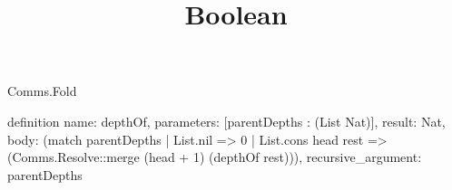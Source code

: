 \begin{lexlean}{Comms.Fold}
\title{Boolean}
\begin{semanticmodule}
definition{
  name: depthOf,
  parameters: [parentDepths : (List Nat)],
  result: Nat,
  body: (match parentDepths
    | List.nil => 0
    | List.cons head rest => (Comms.Resolve::merge (head + 1) (depthOf rest))),
  recursive_argument: parentDepths
}
\end{semanticmodule}
\end{lexlean}
